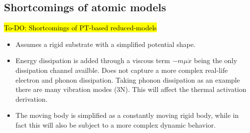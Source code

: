 \subsection{Shortcomings of atomic models}
\hl{To-DO: Shortcomings of PT-based reduced-models} %
\begin{itemize}
  \item Assumes a rigid substrate with a simplified potential shape. 
  \item Energy dissipation is added through a viscous term $-m\mu \dot{x}$ being the only dissipation channel availble. Does not capture a more complex real-life electron and phonon dissipation. Taking phonon dissipation as an example there are many vibration modes (3N). This will affect the thermal activation derivation. 
  \item The moving body is simplified as a constantly moving rigid body, while in fact this will also be subject to a more complex dynamic behavior.
\end{itemize}












